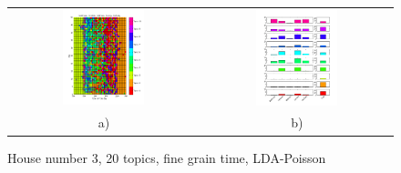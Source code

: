 \begin{figure}[h!]
 \centering
 \begin{tabular}{c c}
  \includegraphics[width=0.45\textwidth]{Pictures/Pois/fine/DayHN3TS48k20fine.png}
  &
  \includegraphics[width=0.45\textwidth]{Pictures/Pois/fine/TopHN3TS48k20fine.png}\\
  a) & b)
 \end{tabular}
  \caption{House number 3, 20 topics, fine grain time, LDA-Poisson}
\end{figure}

